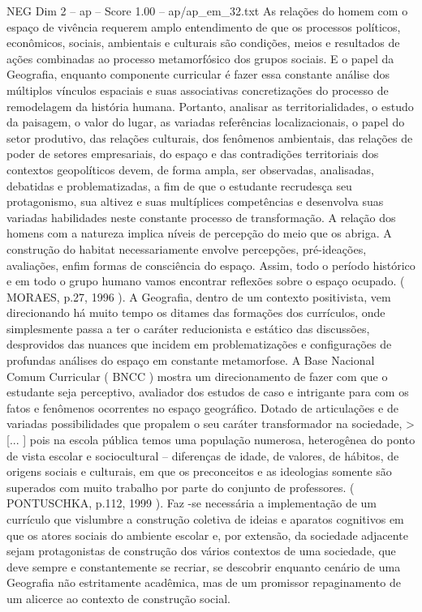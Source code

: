 \begin{textsample}{NEG Dim 2 – ap – Score 1.00 – ap/ap\_em\_32.txt}
As relações do homem com o espaço de vivência requerem amplo entendimento de que os processos políticos, econômicos, sociais, ambientais e culturais são condições, meios e resultados de ações combinadas ao processo metamorfósico dos grupos sociais.
E o papel da Geografia, enquanto componente curricular é fazer essa constante análise dos múltiplos vínculos espaciais e suas associativas concretizações do processo de remodelagem da história humana.
Portanto, analisar as territorialidades, o estudo da paisagem, o valor do lugar, as variadas referências localizacionais, o papel do setor produtivo, das relações culturais, dos fenômenos ambientais, das relações de poder de setores empresariais, do espaço e das contradições territoriais dos contextos geopolíticos devem, de forma ampla, ser observadas, analisadas, debatidas e problematizadas, a fim de que o estudante recrudesça seu protagonismo, sua altivez e suas multíplices competências e desenvolva suas variadas habilidades neste constante processo de transformação.
A relação dos homens com a natureza implica níveis de percepção do meio que os abriga.
A construção do habitat necessariamente envolve percepções, pré-ideações, avaliações, enfim formas de consciência do espaço.
Assim, todo o período histórico e em todo o grupo humano vamos encontrar reflexões sobre o espaço ocupado. ( MORAES, p.27, 1996 ).
A Geografia, dentro de um contexto positivista, vem direcionando há muito tempo os ditames das formações dos currículos, onde simplesmente passa a ter o caráter reducionista e estático das discussões, desprovidos das nuances que incidem em problematizações e configurações de profundas análises do espaço em constante metamorfose.
A Base Nacional Comum Curricular ( BNCC ) mostra um direcionamento de fazer com que o estudante seja perceptivo, avaliador dos estudos de caso e intrigante para com os fatos e fenômenos ocorrentes no espaço geográfico.
Dotado de articulações e de variadas possibilidades que propalem o seu caráter transformador na sociedade, > [... ] pois na escola pública temos uma população numerosa, heterogênea do ponto de vista escolar e sociocultural – diferenças de idade, de valores, de hábitos, de origens sociais e culturais, em que os preconceitos e as ideologias somente são superados com muito trabalho por parte do conjunto de professores. ( PONTUSCHKA, p.112, 1999 ).
Faz -se necessária a implementação de um currículo que vislumbre a construção coletiva de ideias e aparatos cognitivos em que os atores sociais do ambiente escolar e, por extensão, da sociedade adjacente sejam protagonistas de construção dos vários contextos de uma sociedade, que deve sempre e constantemente se recriar, se descobrir enquanto cenário de uma Geografia não estritamente acadêmica, mas de um promissor repaginamento de um alicerce ao contexto de construção social.

\end{textsample}
